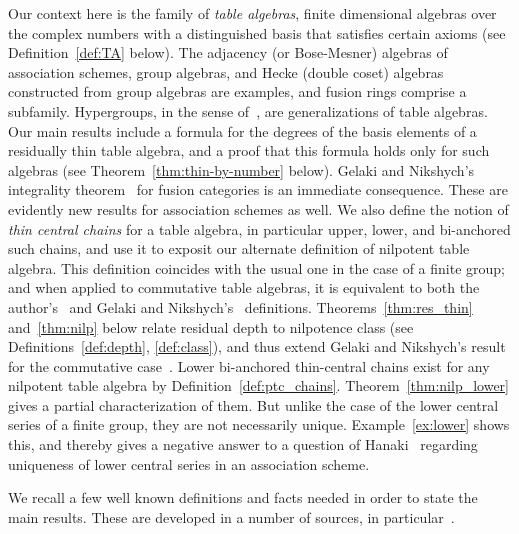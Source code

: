 Our context here is the family of \emph{table algebras}, finite
dimensional algebras over the complex numbers with a distinguished basis
that satisfies certain axioms (see Definition~\ref{def:TA} below). The
adjacency (or Bose-Mesner) algebras of association schemes, group
algebras, and Hecke (double coset) algebras constructed from group
algebras are examples, and fusion rings comprise a subfamily.
Hypergroups, in the sense of~\cite{FZ}, are generalizations of table
algebras. Our main results include a formula for the degrees of the
basis elements of a residually thin table algebra, and a proof that this
formula holds only for such algebras (see Theorem~\ref{thm:thin-by-number} 
below). Gelaki and Nikshych's integrality theorem~\cite [Corollary~5.3]{GN} for fusion categories is an immediate consequence. These are evidently new results
for association schemes as well. We also define the notion of
\emph{thin central chains} for a table algebra, in particular upper,
lower, and bi-anchored such chains, and use it to exposit our alternate
definition of nilpotent table algebra. This definition coincides with the usual one
in the case of a finite group; and when applied to commutative table
algebras, it is equivalent to both the author's~\cite{Blau1} and Gelaki
and Nikshych's~\cite{GN} definitions. Theorems~\ref{thm:res_thin} and~\ref{thm:nilp} 
below relate residual depth to nilpotence class (see Definitions~\ref{def:depth}, \ref{def:class}), 
and thus extend 
Gelaki and
Nikshych's result for the commutative case~\cite [Theorem~4.16]{GN}.
Lower bi-anchored thin-central chains exist for any nilpotent table
algebra by Definition~\ref{def:ptc_chains}. Theorem~\ref{thm:nilp_lower} gives a partial characterization of them. But
unlike the case of the lower central series of a finite group, they are
not necessarily unique. Example~\ref{ex:lower} shows this, and thereby
gives a negative answer to a question of Hanaki~\cite [Question~2.11]{H} regarding uniqueness of lower central series in an association
scheme.
 

We recall a few well known definitions and facts needed in order to
state the main results. These are developed in a number of sources, in
particular~\cite{AFM, BZ,Blau2}.


